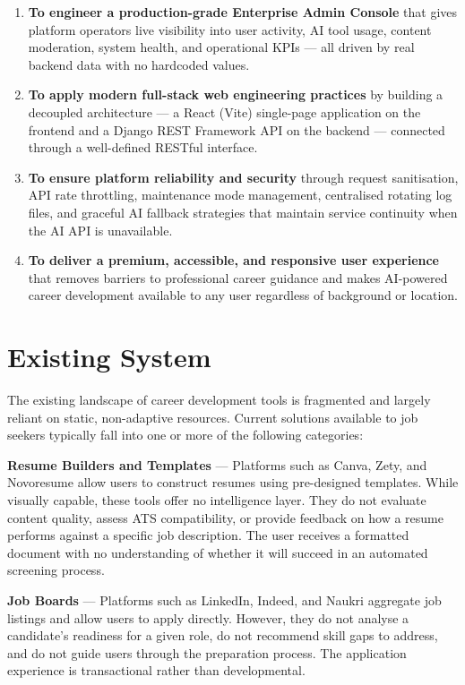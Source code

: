 \documentclass[12pt]{article}
\begin{document}
\begin{enumerate}
  \item \textbf{To engineer a production-grade Enterprise Admin Console} that gives platform operators live visibility into user activity, AI tool usage, content moderation, system health, and operational KPIs --- all driven by real backend data with no hardcoded values.

  \item \textbf{To apply modern full-stack web engineering practices} by building a decoupled architecture --- a React (Vite) single-page application on the frontend and a Django REST Framework API on the backend --- connected through a well-defined RESTful interface.

  \item \textbf{To ensure platform reliability and security} through request sanitisation, API rate throttling, maintenance mode management, centralised rotating log files, and graceful AI fallback strategies that maintain service continuity when the AI API is unavailable.

  \item \textbf{To deliver a premium, accessible, and responsive user experience} that removes barriers to professional career guidance and makes AI-powered career development available to any user regardless of background or location.
\end{enumerate}

\clearpage
\section{Existing System}

The existing landscape of career development tools is fragmented and largely reliant on static, non-adaptive resources. Current solutions available to job seekers typically fall into one or more of the following categories:

\textbf{Resume Builders and Templates} --- Platforms such as Canva, Zety, and Novoresume allow users to construct resumes using pre-designed templates. While visually capable, these tools offer no intelligence layer. They do not evaluate content quality, assess ATS compatibility, or provide feedback on how a resume performs against a specific job description. The user receives a formatted document with no understanding of whether it will succeed in an automated screening process.

\textbf{Job Boards} --- Platforms such as LinkedIn, Indeed, and Naukri aggregate job listings and allow users to apply directly. However, they do not analyse a candidate's readiness for a given role, do not recommend skill gaps to address, and do not guide users through the preparation process. The application experience is transactional rather than developmental.
\end{document}
